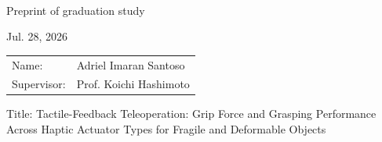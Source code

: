 \documentclass[a4paper, 11pt]{article}
\newcommand\textline[4][t]{%
  \par\smallskip\noindent\parbox[#1]{.333\textwidth}{\raggedright #2}%
  \parbox[#1]{.333\textwidth}{\centering #3}%
  \parbox[#1]{.333\textwidth}{\raggedleft #4}\par\smallskip%
}
\begin{document}
\pagestyle{empty}

\textline[t]{\,\,}{Preprint of graduation study}{Jul. 28, 2026}
\vspace{0.1\baselineskip}
\begin{flushright}
  \begin{tabular}{@{}ll@{}}
    Name:       & Adriel Imaran Santoso  \\
    Supervisor: & Prof. Koichi Hashimoto \\
  \end{tabular}
\end{flushright}
\begin{center}
  Title: Tactile-Feedback Teleoperation: Grip Force and Grasping Performance \\
  Across Haptic Actuator Types for Fragile and Deformable Objects
\end{center}
\vspace{0.2\baselineskip}
\end{document}
